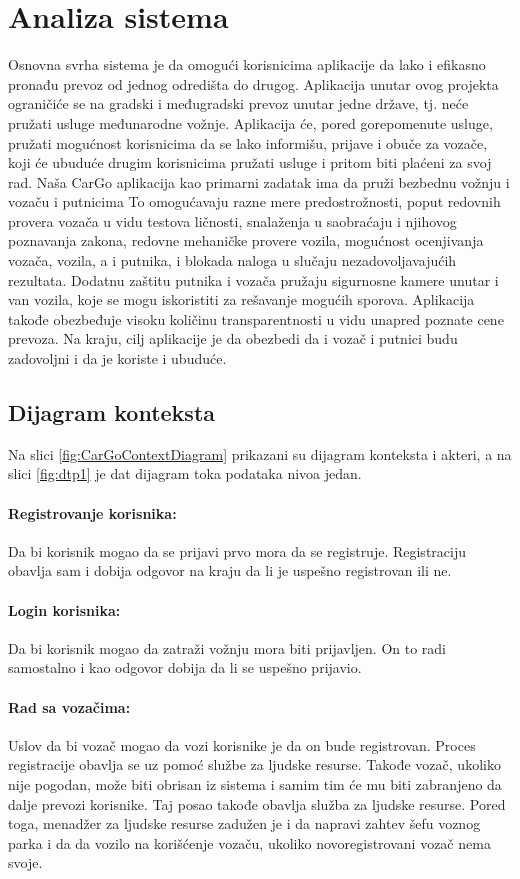 \section{\bfseries Analiza sistema}

Osnovna svrha sistema je da omogući korisnicima aplikacije da lako i efikasno pronađu prevoz od jednog odredišta do drugog. Aplikacija unutar ovog projekta ograničiće se na gradski i međugradski prevoz unutar jedne države, tj. neće pružati usluge međunarodne vožnje. Aplikacija će, pored gorepomenute usluge, pružati mogućnost korisnicima da se lako informišu, prijave i obuče za vozače, koji će ubuduće drugim korisnicima pružati usluge i pritom biti plaćeni za svoj rad. Naša CarGo aplikacija kao primarni zadatak ima da pruži bezbednu vožnju i vozaču i putnicima To omogućavaju razne mere predostrožnosti, poput redovnih provera vozača u vidu testova ličnosti, snalaženja u saobraćaju i njihovog poznavanja zakona, redovne mehaničke provere vozila, mogućnost ocenjivanja vozača, vozila, a i putnika, i blokada naloga u slučaju nezadovoljavajućih rezultata. Dodatnu zaštitu putnika i vozača pružaju sigurnosne kamere unutar i van vozila, koje se mogu iskoristiti za rešavanje mogućih sporova. Aplikacija takođe obezbeđuje visoku količinu transparentnosti u vidu unapred poznate cene prevoza. Na kraju, cilj aplikacije je da obezbedi da i vozač i putnici budu zadovoljni i da je koriste i ubuduće.
     
\subsection{\bfseries Dijagram konteksta}

\quad Na slici \ref{fig:CarGoContextDiagram} prikazani su dijagram konteksta i akteri, a na slici \ref{fig:dtp1} je dat dijagram toka podataka nivoa jedan.
\paragraph{Registrovanje korisnika:}
    Da bi korisnik mogao da se prijavi prvo mora da se registruje. Registraciju obavlja sam i dobija odgovor na kraju da li je uspešno registrovan ili ne.
\paragraph{Login korisnika:}
    Da bi korisnik mogao da zatraži vožnju mora biti prijavljen. On to radi samostalno i kao odgovor dobija da li se uspešno prijavio.
\paragraph{Rad sa vozačima:}
    Uslov da bi vozač mogao da vozi korisnike je da on bude registrovan. Proces registracije obavlja se uz pomoć službe za ljudske resurse. Takođe vozač, ukoliko nije pogodan, može biti obrisan iz sistema i samim tim će mu biti zabranjeno da dalje prevozi korisnike. Taj posao takođe obavlja služba za ljudske resurse. Pored toga, menadžer za ljudske resurse zadužen je i da napravi zahtev šefu voznog parka i da da vozilo na korišćenje vozaču, ukoliko novoregistrovani vozač nema svoje.
